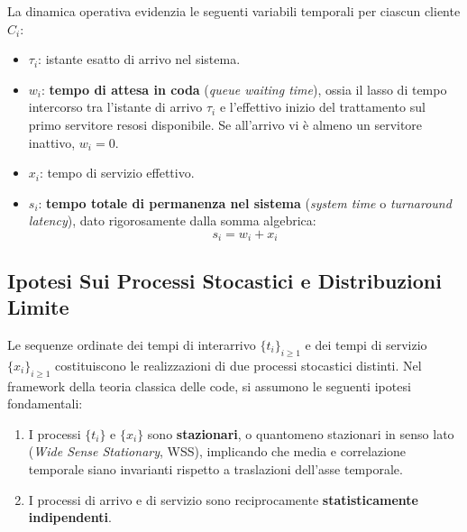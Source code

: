 \documentclass[11pt, a4paper]{article}
\begin{document}

La dinamica operativa evidenzia le seguenti variabili temporali per ciascun cliente $C_i$:
\begin{itemize}[leftmargin=*]
    \item $\tau_i$: istante esatto di arrivo nel sistema.
    \item $w_i$: \textbf{tempo di attesa in coda} (\emph{queue waiting time}), ossia il lasso di tempo intercorso tra l'istante di arrivo $\tau_i$ e l'effettivo inizio del trattamento sul primo servitore resosi disponibile. Se all'arrivo vi è almeno un servitore inattivo, $w_i = 0$.
    \item $x_i$: tempo di servizio effettivo.
    \item $s_i$: \textbf{tempo totale di permanenza nel sistema} (\emph{system time} o \emph{turnaround latency}), dato rigorosamente dalla somma algebrica:
    \[
        \boxed{s_i = w_i + x_i}
    \]
\end{itemize}

\subsection{Ipotesi Sui Processi Stocastici e Distribuzioni Limite}

Le sequenze ordinate dei tempi di interarrivo $\{t_i\}_{i \ge 1}$ e dei tempi di servizio $\{x_i\}_{i \ge 1}$ costituiscono le realizzazioni di due processi stocastici distinti. Nel framework della teoria classica delle code, si assumono le seguenti ipotesi fondamentali:
\begin{enumerate}
    \item I processi $\{t_i\}$ e $\{x_i\}$ sono \textbf{stazionari}, o quantomeno stazionari in senso lato (\emph{Wide Sense Stationary}, WSS), implicando che media e correlazione temporale siano invarianti rispetto a traslazioni dell'asse temporale.
    \item I processi di arrivo e di servizio sono reciprocamente \textbf{statisticamente indipendenti}.
\end{enumerate}
\end{document}
